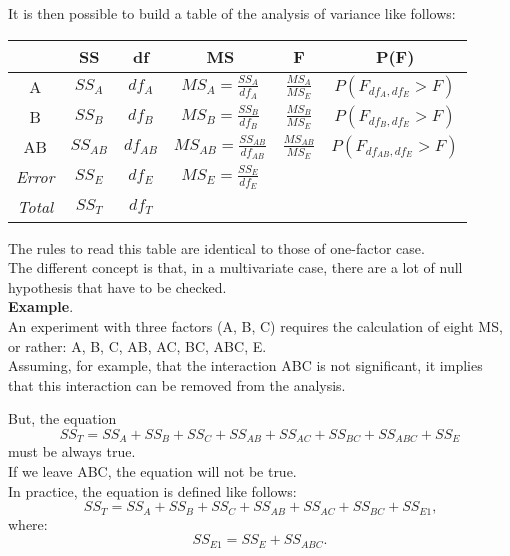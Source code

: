 \begin{frame}
  \vspace*{.25cm} 
  It is then possible to build a table of the analysis of variance like follows:\\
  \vspace*{.75cm}
  \begin{tabular}{|c|c|c|c|c|c|}
    \hline
    & SS & df & MS & F & P(F)\\ \hline
    A & $SS_A$ & $df_A$ & $MS_A=\frac{SS_A}{df_A}$  & $\frac{MS_A}{MS_E}$ & $P(F_{df_A,df_E}>F)$\\ \hline
    B & $SS_B$ & $df_B$ & $MS_B=\frac{SS_B}{df_B}$  & $\frac{MS_B}{MS_E}$ & $P(F_{df_B,df_E}>F)$\\ \hline
    AB & $SS_{AB}$ & $df_{AB}$ & $MS_{AB}=\frac{SS_{AB}}{df_{AB}}$  & $\frac{MS_{AB}}{MS_E}$ & $P(F_{df_{AB},df_E}>F)$\\ \hline
    \textit{Error} & $SS_E$ & $df_E$ & $MS_E=\frac{SS_E}{df_E}$  &  & \\ \hline
    \textit{Total} & $SS_T$ & $df_T$ &   &  & \\ \hline
  \end{tabular}   
  \vspace*{.5cm}      
\end{frame}

\begin{frame}
  \vspace*{.25cm} 
  The rules to read this table are identical to those of one-factor case.\\
  \vspace*{.25cm} 
  The different concept is that, in a multivariate case, there are a lot of null hypothesis that have to be checked.\\
  \vspace*{.5cm} 
  \textbf{Example}.\\
  An experiment with three factors (A, B, C) requires the calculation of eight MS, or rather: A, B, C, AB, AC, BC, ABC, E.\\
  \vspace*{.25cm} 
  Assuming, for example, that the interaction ABC is not significant, it implies that this interaction can be removed from the analysis.
\end{frame}

\begin{frame}
  \vspace*{.25cm} 
  But, the equation
  $$ SS_{T}=SS_A+SS_B+SS_C+SS_{AB}+SS_{AC}+SS_{BC}+SS_{ABC}+SS_E $$
  must be always true.\\
  \vspace*{.25cm}
  If we leave ABC, the equation will not be true.\\
  \vspace*{.5cm}
  In practice, the equation is defined like follows:
  $$ SS_{T} = SS_A + SS_B + SS_C + SS_{AB} + SS_{AC} + SS_{BC} + SS_{E1} \mbox{,} $$
  where:
  $$ SS_{E1} = SS_E + SS_{ABC} \mbox{.} $$
\end{frame}

